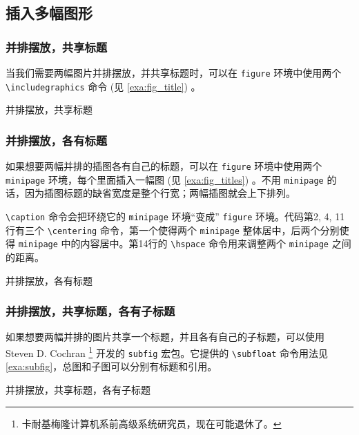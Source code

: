 \subsection{插入多幅图形}
\subsubsection{并排摆放，共享标题}

当我们需要两幅图片并排摆放，并共享标题时，可以在 \texttt{figure} 环境中使用两个 \verb|\includegraphics| 命令 (见 \autoref{exa:fig_title}) 。

\begin{example}[h]
\caption{并排摆放，共享标题}
\label{exa:fig_title}
\end{example}

\subsubsection{并排摆放，各有标题}

如果想要两幅并排的插图各有自己的标题，可以在 \texttt{figure} 环境中使用两个 \texttt{minipage} 环境，每个里面插入一幅图 (见 \autoref{exa:fig_titles}) 。不用 \texttt{minipage} 的话，因为插图标题的缺省宽度是整个行宽；两幅插图就会上下排列。

\verb|\caption| 命令会把环绕它的 \texttt{minipage} 环境“变成” \texttt{figure} 环境。代码第2, 4, 11行有三个 \verb|\centering| 命令，第一个使得两个 \texttt{minipage} 整体居中，后两个分别使得 \texttt{minipage} 中的内容居中。第14行的 \verb|\hspace| 命令用来调整两个 \texttt{minipage} 之间的距离。


\begin{example}[h]
\caption{并排摆放，各有标题}
\label{exa:fig_titles}
\end{example}

\subsubsection{并排摆放，共享标题，各有子标题}

如果想要两幅并排的图片共享一个标题，并且各有自己的子标题，可以使用 Steven D. Cochran\indexCochran{} \footnote{卡耐基梅隆计算机系前高级系统研究员，现在可能退休了。} 开发的 \texttt{subfig} 宏包。它提供的 \verb|\subfloat| 命令用法见 \autoref{exa:subfig}，总图和子图可以分别有标题和引用。

\begin{example}[htbp]
\caption{并排摆放，共享标题，各有子标题}
\label{exa:subfig}
\end{example}

